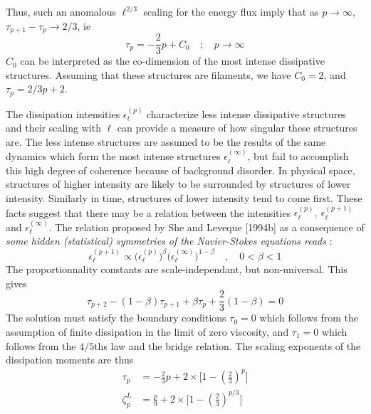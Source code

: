Thus, such an anomalous $\ell^{2/3}$ scaling for the energy flux imply that as $p\rightarrow\infty$, $\tau_{p+1}-\tau_p\rightarrow2/3$, ie
\begin{equation}
    \tau_p=-\frac{2}{3}p+C_0 \quad;\quad p\rightarrow\infty
\end{equation}
$C_0$ can be interpreted as the co-dimension of the most intense dissipative structures.
Assuming that these structures are filaments, we have $C_0=2$, and $\tau_p=2/3p+2$. 

The dissipation intensities $\epsilon_\ell^{(p)}$ characterize less intense dissipative structures and their scaling with $\ell$ can provide a measure of how singular these structures are. The less intense structures are assumed to be the results of the same dynamics which form the most intense structures $\epsilon_\ell^{(\infty)}$, but fail to accomplish this high degree of coherence because of background disorder. In physical space, structures of higher intensity are likely to be surrounded by structures of lower intensity. Similarly in time, structures of lower intensity tend to come first. These facts suggest that there may be a relation between
the intensities $\epsilon_\ell^{(p)},~\epsilon_\ell^{(p+1)}$  and $\epsilon_\ell^{(\infty)}$. The relation proposed by She and Leveque [1994b] as a consequence of \emph{some hidden (statistical) symmetries of the Navier-Stokes equations reads} : 
\begin{equation}
    \epsilon_\ell^{(p+1)}\propto\Big(\epsilon_\ell^{(p)}\Big)^\beta\Big(\epsilon_\ell^{(\infty)}\Big)^{1-\beta}\quad,\quad0<\beta<1
\end{equation}
The proportionnality constants are scale-independant, but non-universal. This gives 
\begin{equation}
    \tau_{p+2}-(1-\beta)\tau_{p+1}+\beta\tau_p+\frac{2}{3}(1-\beta)=0
\end{equation}
The solution must satisfy the boundary conditions $\tau_0=0$ which follows from the assumption of finite dissipation in the limit of zero viscosity, and $\tau_1=0$ which follows from the $4/5$ths law and the bridge relation. 
The scaling exponents of the dissipation moments are thus
\begin{align}
    \tau_p&=-\frac{2}{3}p+2\times\bigg[1-\left(\frac{2}{3}\right)^p\bigg]\\
    \zeta_p^L&=\frac{p}{9}+2\times\bigg[1-\left(\frac{2}{3}\right)^{p/3}\bigg]
\end{align}
